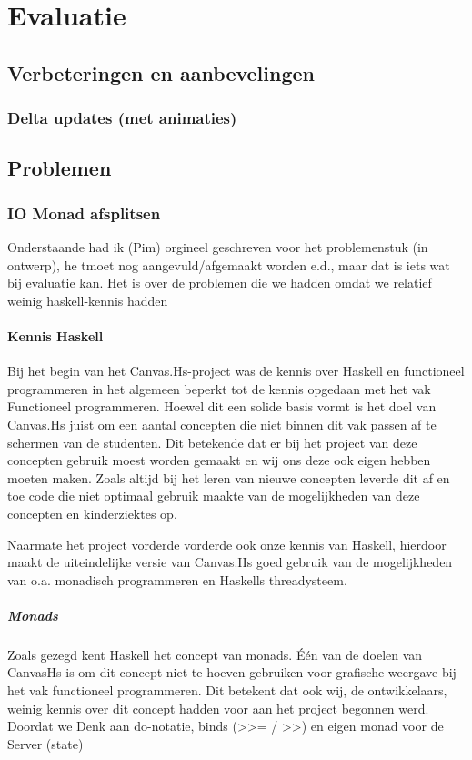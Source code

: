 \chapter{Evaluatie} \label{hoofdstuk:evaluatie}

\section{Verbeteringen en aanbevelingen}
\subsection{Delta updates (met animaties)}

\section{Problemen}
\subsection{IO Monad afsplitsen}

{\color{red} Onderstaande had ik (Pim) orgineel geschreven voor het problemenstuk (in ontwerp), he tmoet nog aangevuld/afgemaakt worden e.d., maar dat is iets wat bij evaluatie kan. Het is over de problemen die we hadden omdat we relatief weinig haskell-kennis hadden}

\subsubsection{Kennis Haskell}
Bij het begin van het Canvas.Hs-project was de kennis over Haskell en functioneel programmeren in het algemeen beperkt tot de kennis opgedaan met het vak Functioneel programmeren. Hoewel dit een solide basis vormt is het doel van Canvas.Hs juist om een aantal concepten die niet binnen dit vak passen af te schermen van de studenten. Dit betekende dat er bij het project van deze concepten gebruik moest worden gemaakt en wij ons deze ook eigen hebben moeten maken. Zoals altijd bij het leren van nieuwe concepten leverde dit af en toe code die niet optimaal gebruik maakte van de mogelijkheden van deze concepten en kinderziektes op. 

Naarmate het project vorderde vorderde ook onze kennis van Haskell, hierdoor maakt de uiteindelijke versie van Canvas.Hs goed gebruik van de mogelijkheden van o.a. monadisch programmeren en Haskells threadysteem. 
\paragraph{Monads}
Zoals gezegd kent Haskell het concept van monads. Één van de doelen van CanvasHs is om dit concept niet te hoeven gebruiken voor grafische weergave bij het vak functioneel programmeren. Dit betekent dat ook wij, de ontwikkelaars, weinig kennis over dit concept hadden voor aan het project begonnen werd. Doordat we 
Denk aan do-notatie, binds (>>= / >>) en eigen monad voor de Server (state)


